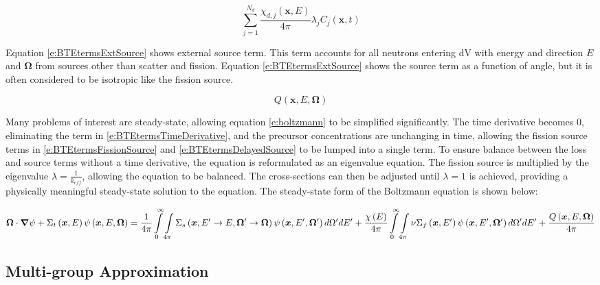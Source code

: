 \begin{equation}\label{e:BTEtermsDelayedSource}
{\sum_{j=1}^{N_d} \frac{\chi_{d,j}\left(\bm x,E\right)}{4\pi} \lambda_j C_j\left(\bm x,t\right)}
\end{equation}

Equation \ref{e:BTEtermsExtSource} shows external source term.  This term accounts for all neutrons entering dV with energy and direction $E$ and $\bm\Omega$ from sources other than scatter and fission.  Equation \ref{e:BTEtermsExtSource} shows the source term as a function of angle, but it is often considered to be isotropic like the fission source.

\begin{equation}\label{e:BTEtermsExtSource}
Q\left(\bm x,E,\bm\Omega\right)
\end{equation}

Many problems of interest are steady-state, allowing equation \ref{e:boltzmann} to be simplified significantly.  The time derivative becomes 0, eliminating the term in \ref{e:BTEtermsTimeDerivative}, and the precursor concentrations are unchanging in time, allowing the fission source terms in \ref{e:BTEtermsFissionSource} and \ref{e:BTEtermsDelayedSource} to be lumped into a single term.  To ensure balance between the loss and source terms without a time derivative, the equation is reformulated as an eigenvalue equation.  The fission source is multiplied by the eigenvalue $\lambda = \frac{1}{k_{eff}}$, allowing the equation to be balanced.  The cross-sections can then be adjusted until $\lambda = 1$ is achieved, providing a physically meaningful steady-state solution to the equation.  The steady-state form of the Boltzmann equation is shown below:

\begin{dmath}\label{e:ssboltzmann}
{\bm \Omega \cdot \bm \nabla \psi + \Sigma_t\left(\bm x,E\right)\psi\left(\bm x,E,\bm \Omega\right) = \frac{1}{4\pi}\intop_0^{\infty} \intop_{4\pi} \Sigma_s\left(\bm x,E' \rightarrow E, \bm \Omega' \rightarrow \bm \Omega\right) \psi\left(\bm x,E',\bm \Omega'\right) d\Omega' dE'} + {\frac{\chi\left(E\right)}{4\pi} \intop_0^{\infty} \intop_{4\pi} \nu \Sigma_f\left(\bm x,E'\right) \psi\left(\bm x,E',\bm \Omega'\right) d\Omega' dE' + \frac{Q\left(\bm x,E,\bm \Omega\right)}{4\pi}}
\end{dmath}

\subsection{Multi-group Approximation}

